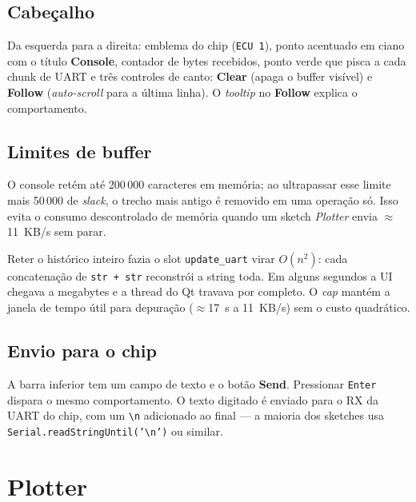\documentclass[12pt,a4paper]{article}
\begin{document}
\subsection{Cabeçalho}

Da esquerda para a direita: emblema do chip (\texttt{ECU 1}), ponto
acentuado em ciano com o título \textbf{Console}, contador de bytes
recebidos, ponto verde que pisca a cada chunk de UART e três
controles de canto: \textbf{Clear} (apaga o buffer visível) e
\textbf{Follow} (\emph{auto-scroll} para a última linha). O
\emph{tooltip} no \textbf{Follow} explica o comportamento.

\subsection{Limites de buffer}

O console retém até 200\,000 caracteres em memória; ao ultrapassar
esse limite mais 50\,000 de \emph{slack}, o trecho mais antigo é
removido em uma operação só. Isso evita o consumo descontrolado de
memória quando um sketch \emph{Plotter} envia $\approx$11~KB/s
sem parar.

\begin{notabox}
Reter o histórico inteiro fazia o slot \texttt{update\_uart} virar
$O(n^2)$: cada concatenação de \texttt{str + str} reconstrói a
string toda. Em alguns segundos a UI chegava a megabytes e a thread
do Qt travava por completo. O \emph{cap} mantém a janela de tempo
útil para depuração ($\approx$17~s a 11~KB/s) sem o custo
quadrático.
\end{notabox}

\subsection{Envio para o chip}

A barra inferior tem um campo de texto e o botão \textbf{Send}.
Pressionar \texttt{Enter} dispara o mesmo comportamento. O texto
digitado é enviado para o RX da UART do chip, com um \texttt{\textbackslash n}
adicionado ao final --- a maioria dos sketches usa
\texttt{Serial.readStringUntil('\textbackslash n')} ou similar.

\section{Plotter}
\end{document}
